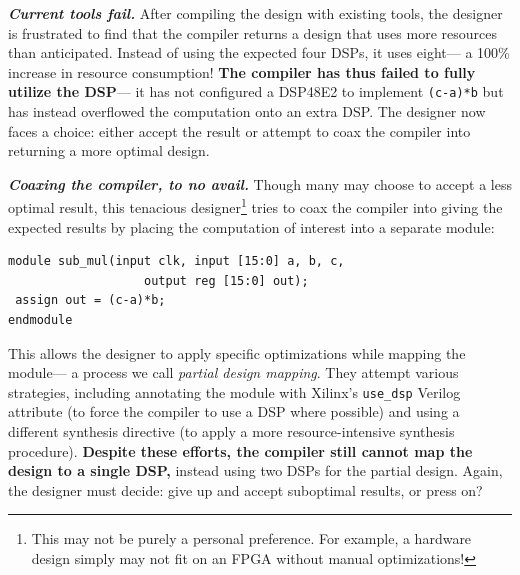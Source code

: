 \textit{\textbf{Current tools fail.}}
After compiling the design
  with existing tools,
  the designer is frustrated
  to find that the compiler returns a design
  that uses more
  resources than anticipated.
Instead of using the expected
  four DSPs, it uses eight---%
  a 100\% increase in resource consumption!
\textbf{The compiler has thus failed to 
  fully utilize
  the DSP}---%
  it has not configured a DSP48E2
  to implement
  \texttt{(c-a)*b} but has instead
  overflowed the
  computation
  onto
  an extra DSP.
The designer now faces a choice:
  either accept the result or attempt to coax the compiler
  into returning a more optimal design.

\textit{\textbf{Coaxing the compiler, to no avail.}}
Though many 
may choose to accept a less optimal result,
 this tenacious designer\footnote{
This may not be purely a personal preference. %
For example, a hardware design simply may not fit on an FPGA
  without manual optimizations!}
  tries to coax
  the compiler into giving the 
  expected results
  by 
  placing the computation
  of interest into a separate module:

\begin{verbatim}
module sub_mul(input clk, input [15:0] a, b, c,
                   output reg [15:0] out);
 assign out = (c-a)*b;
endmodule
\end{verbatim}

\noindent
This allows the designer
  to  apply
  specific optimizations while mapping
  the module---%
  a process we call \textit{partial design mapping}.
They attempt various strategies,
  including
  annotating the module with
  Xilinx's \texttt{use\_dsp} Verilog attribute
  (to force the compiler to use a DSP where possible)
  and using a different
  synthesis directive
  (to apply a more 
  resource-intensive synthesis
  procedure).
\textbf{Despite these efforts,
  the compiler still cannot 
  map the design
  to a single DSP,}
  instead using two DSPs
  for the partial design.
Again, the designer must decide:
  give up and accept
  suboptimal results,
  or press on?


